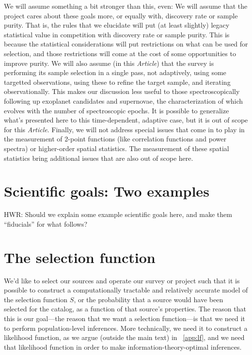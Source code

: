 \documentclass[modern]{aastex62}
\newcommand{\documentname}{\textsl{Article}}
\begin{document}
We will assume something a bit stronger than this, even:
We will assume that the project cares about these goals more,
or equally with, discovery rate or sample purity.
That is, the rules that we elucidate will put (at least slightly)
legacy statistical value in competition with discovery rate or sample
purity.
This is because the statistical considerations will put restrictions
on what can be used for selection, and those restrictions will come at
the cost of some opportunities to improve purity.
We will also assume (in this \documentname) that the survey is performing
its sample selection in a single pass, not adaptively, using some
targetted observations, using these to refine the target sample, and
iterating observationally.
This makes our discussion less useful to those spectroscopically following up exoplanet
candidates and supernovae, the characterization of which evolves with
the number of spectroscopic epochs.
It is possible to generalize what's presented here to this time-dependent, adaptive
case, but it is out of scope for this \documentname.
Finally, we will not address special issues that come in to play in the
measurement of 2-point functions (like correlation functions and power
spectra) or higher-order spatial statistics.
The measurement of these spatial statistics bring additional issues
that are also out of scope here.

\section{Scientific goals: Two examples}

HWR: Should we explain some example scientific goals here, and make
them ``fiducials'' for what follows?

\section{The selection function}\label{sec:sf}

We'd like to select our sources and operate our survey or project such
that it is possible to construct a computationally tractable and
relatively accurate model of the selection function $S$, or the
probability that a source would have been selected for the catalog, as
a function of that source's properties.
The reason that this is our goal---the reason that we want a selection
function---is that we need it to perform population-level inferences.
More technically, we need it to construct a likelihood function, as we
argue (outside the main text)
in \appendixname~\ref{app:lf}, and we need that likelihood
function in order to make information-theory-optimal inferences.
\end{document}
